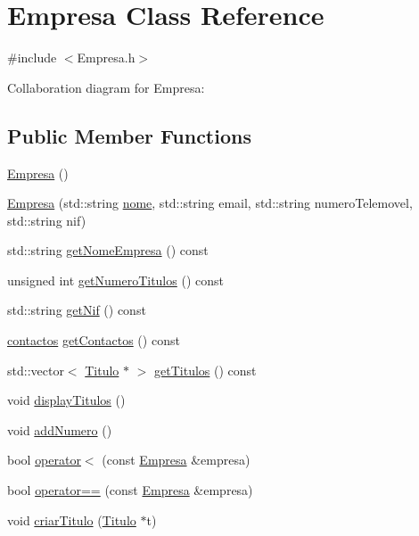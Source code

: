 \hypertarget{class_empresa}{}\section{Empresa Class Reference}
\label{class_empresa}


{\ttfamily \#include $<$Empresa.\+h$>$}



Collaboration diagram for Empresa\+:
\subsection*{Public Member Functions}
\begin{DoxyCompactItemize}
\item 
\mbox{\hyperlink{class_empresa_aff124b958356c479ab50ddf4cf302193}{Empresa}} ()
\item 
\mbox{\hyperlink{class_empresa_a19748f9e5c99292e3cd1489712751271}{Empresa}} (std\+::string \mbox{\hyperlink{class_empresa_affa32f93b722be794531dbfb26cb19b3}{nome}}, std\+::string email, std\+::string numero\+Telemovel, std\+::string nif)
\item 
std\+::string \mbox{\hyperlink{class_empresa_a99bc2de98a0c0348abb74c93e6e7159e}{get\+Nome\+Empresa}} () const
\item 
unsigned int \mbox{\hyperlink{class_empresa_a49b2b94a54bbc341822f64fc194f98fd}{get\+Numero\+Titulos}} () const
\item 
std\+::string \mbox{\hyperlink{class_empresa_a6ab12452496ccaea5493bd2c67824f09}{get\+Nif}} () const
\item 
\mbox{\hyperlink{structcontactos}{contactos}} \mbox{\hyperlink{class_empresa_a19396f860d9b17f94bd262ba093d76eb}{get\+Contactos}} () const
\item 
std\+::vector$<$ \mbox{\hyperlink{class_titulo}{Titulo}} $\ast$ $>$ \mbox{\hyperlink{class_empresa_a672f3a89b0e41dd758ab6baf1a8dfbd2}{get\+Titulos}} () const
\item 
void \mbox{\hyperlink{class_empresa_af067f4d00a5ceb8816a607164916d2e1}{display\+Titulos}} ()
\item 
void \mbox{\hyperlink{class_empresa_a3e40c710d76874bcfcf4bd83592d4f13}{add\+Numero}} ()
\item 
bool \mbox{\hyperlink{class_empresa_ab643d752365e59fa1d90a41b8a036d6a}{operator$<$}} (const \mbox{\hyperlink{class_empresa}{Empresa}} \&empresa)
\item 
bool \mbox{\hyperlink{class_empresa_ad915fb38bc6c73c02fe70c62db1c9f03}{operator==}} (const \mbox{\hyperlink{class_empresa}{Empresa}} \&empresa)
\item 
void \mbox{\hyperlink{class_empresa_a3c6eb96c694dcb6db1e402d6db1c439a}{criar\+Titulo}} (\mbox{\hyperlink{class_titulo}{Titulo}} $\ast$t)
\end{DoxyCompactItemize}
